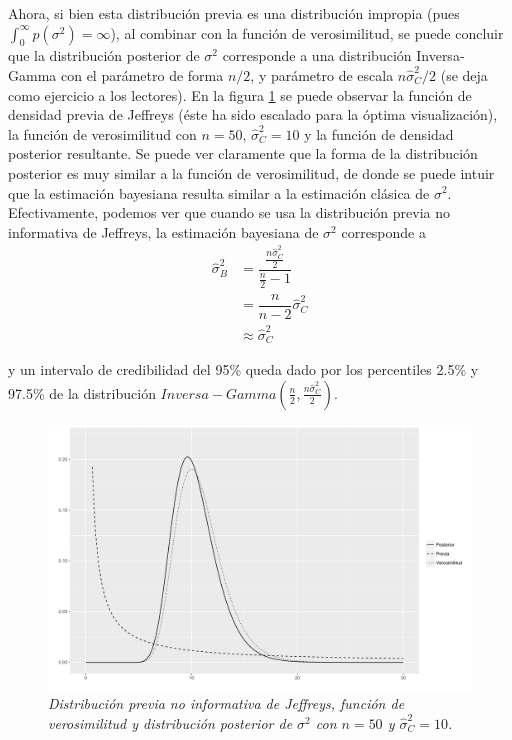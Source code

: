 \documentclass[10pt,openright]{book}\usepackage[]{graphicx}\usepackage[]{color}
\begin{document}
        Ahora, si bien esta distribuci\'on previa es una distribuci\'on impropia (pues $\int_0^\infty p(\sigma^2)=\infty$), al combinar con la funci\'on de verosimilitud, se puede concluir que la distribuci\'on posterior de $\sigma^2$ corresponde a una distribuci\'on Inversa-Gamma con el par\'ametro de forma $n/2$, y par\'ametro de escala $n\hat{\sigma}^2_C/2$ (se deja como ejercicio a los lectores). En la figura \ref{Posterior_Sigma2_Jeffreys} se puede observar la funci\'on de densidad previa de Jeffreys (\'este ha sido escalado para la \'optima visualizaci\'on), la funci\'on de verosimilitud con $n=50$, $\hat{\sigma}^2_C=10$ y la funci\'on de densidad posterior resultante. Se puede ver claramente que la forma de la distribuci\'on posterior es muy similar a la funci\'on de verosimilitud, de donde se puede intuir que la estimaci\'on bayesiana resulta similar a la estimaci\'on cl\'asica de $\sigma^2$. Efectivamente, podemos ver que cuando se usa la distribuci\'on previa no informativa de Jeffreys, la estimaci\'on bayesiana de $\sigma^2$ corresponde a 
    \begin{align*}
    \hat{\sigma}^2_B&=\dfrac{\frac{n\hat{\sigma}^2_C}{2}}{\frac{n}{2}-1}\\
    &=\dfrac{n}{n-2}\hat{\sigma}^2_C\\
    &\approx \hat{\sigma}^2_C
    \end{align*}
    
    y un intervalo de credibilidad del 95\% queda dado por los percentiles 2.5\% y 97.5\% de la distribuci\'on $Inversa-Gamma(\frac{n}{2},\frac{n\hat{\sigma}^2_C}{2})$.
    
    \begin{figure}[!h]
    \centering
    \includegraphics[scale=0.4]{Sigma2_Jeffreys.pdf}
    \caption{\emph{Distribuci\'on previa no informativa de Jeffreys, funci\'on de verosimilitud y distribuci\'on posterior de $\sigma^2$ con $n=50$ y $\hat{\sigma}^2_C=10$.}}
    \label{Posterior_Sigma2_Jeffreys}
    \end{figure}
    
\end{document}
